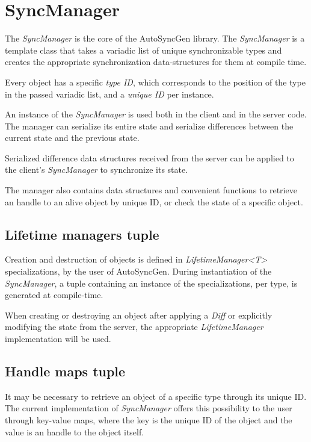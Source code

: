 \documentclass{report}
\begin{document}
        \section{SyncManager}

            The \emph{SyncManager} is the core of the AutoSyncGen library. 
            The \emph{SyncManager} is a template class that takes a variadic list of unique synchronizable types and creates the appropriate synchronization data-structures for them at compile time.

            Every object has a specific \emph{type ID}, which corresponds to the position of the type in the passed variadic list, and a \emph{unique ID} per instance.

            An instance of the \emph{SyncManager} is used both in the client and in the server code. The manager can serialize its entire state and serialize differences between the current state and the previous state.

            Serialized difference data structures received from the server can be applied to the client's \emph{SyncManager} to synchronize its state.

            The manager also contains data structures and convenient functions to retrieve an handle to an alive object by unique ID, or check the state of a specific object.

            \subsection{Lifetime managers tuple}

                Creation and destruction of objects is defined in \emph{LifetimeManager<T>} specializations, by the user of AutoSyncGen.
                During instantiation of the \emph{SyncManager}, a tuple containing an instance of the specializations, per type, is generated at compile-time.

                When creating or destroying an object after applying a \emph{Diff} or explicitly modifying the state from the server, the appropriate \emph{LifetimeManager} implementation will be used.

            \subsection{Handle maps tuple}

                It may be necessary to retrieve an object of a specific type through its unique ID. The current implementation of \emph{SyncManager} offers this possibility to the user through key-value maps, where the key is the unique ID of the object and the value is an handle to the object itself.
\end{document}
